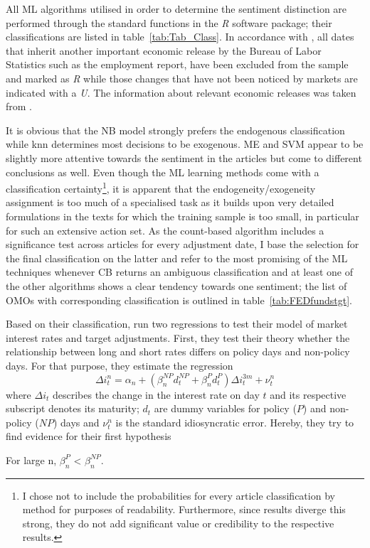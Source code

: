 All ML algorithms utilised in order to determine the sentiment distinction are performed through the standard functions in the \textit{R} software package; their classifications are listed in table~\vref{tab:Tab_Class}. 
In accordance with \textcite{Ellingsen.2003}, all dates that inherit another important economic release by the Bureau of Labor Statistics such as the employment report, have been excluded from the sample and marked as \textit{R} while those changes that have not been noticed by markets are indicated with a \textit{U}. The information about relevant economic releases was taken from \textcite{BoLS.2017}.
%

%
It is obvious that the NB model strongly prefers the endogenous classification while knn determines most decisions to be exogenous. ME and SVM appear to be slightly more attentive towards the sentiment in the articles but come to different conclusions as well. Even though the ML learning methods come with a classification certainty\footnote{I chose not to include the probabilities for every article classification by method for purposes of readability. Furthermore, since results diverge this strong, they do not add significant value or credibility to the respective results.}, it is apparent that the endogeneity/exogeneity assignment is too much of a specialised task as it builds upon very detailed formulations in the texts for which the training sample is too small, in particular for such an extensive action set. As the count-based algorithm includes a significance test across articles for every adjustment date, I base the selection for the final classification on the latter and refer to the most promising of the ML techniques whenever CB returns an ambiguous classification and at least one of the other algorithms shows a clear tendency towards one sentiment; the list of OMOs with corresponding classification is outlined in table~\vref{tab:FEDfundstgt}. %

Based on their classification, \textcite{Ellingsen.2003} run two regressions to test their model of market interest rates and target adjustments. First, they test their theory whether the relationship between long and short rates differs on policy days and non-policy days. For that purpose, they estimate the regression
%
\begin{equation}
	\label{eq:PvsNP}
	\Delta i_t^n = \alpha_n + (\beta_n^{NP}d_t^{NP}+\beta_n^{P}d_t^{P})\Delta i_t^{3m}+\nu_t^n
\end{equation}
%
where $\Delta i_t$ describes the change in the interest rate on day $t$ and its respective subscript denotes its maturity; $d_t$ are dummy variables for policy ($P$) and non-policy ($NP$) days and $\nu_t^n$ is the standard idiosyncratic error. Hereby, they try to find evidence for their first hypothesis 
%
\begin{hypothesis}
	\label{H:1}
	For large n, $\beta_n^P$ < $\beta_n^{NP}$.
\end{hypothesis}
%


